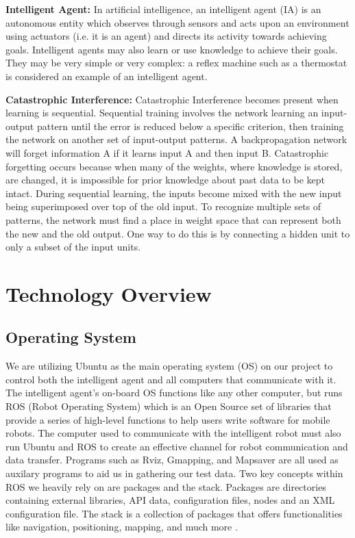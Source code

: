 \documentclass[draftclsnofoot, onecolumn, 10pt, compsoc]{IEEEtran}
\begin{document}
		\noindent\textbf{Intelligent Agent:} In artificial intelligence, an intelligent agent (IA) is an autonomous entity which observes through sensors and acts upon an environment using actuators (i.e. it is an agent) and directs its activity towards achieving goals. Intelligent agents may also learn or use knowledge to achieve their goals. They may be very simple or very complex: a reflex machine such as a thermostat is considered an example of an intelligent agent. \cite{Norvig}

		\noindent\textbf{Catastrophic Interference:} Catastrophic Interference becomes present when learning is sequential. Sequential training involves the network learning an input-output pattern until the error is reduced below a specific criterion, then training the network on another set of input-output patterns. A backpropagation network will forget information A if it learns input A and then input B. Catastrophic forgetting occurs because when many of the weights, where knowledge is stored, are changed, it is impossible for prior knowledge about past data to be kept intact. During sequential learning, the inputs become mixed with the new input being superimposed over top of the old input. To recognize multiple sets of patterns, the network must find a place in weight space that can represent both the new and the old output. One way to do this is by connecting a hidden unit to only a subset of the input units. \cite{ImgRecog} \cite{miller}

	\section{Technology Overview}
		\subsection{Operating System}
			We are utilizing Ubuntu as the main operating system (OS) on our project to control both the intelligent agent and all computers that communicate with it. The intelligent agent's on-board OS functions like any other computer, but runs ROS (Robot Operating System) which is an Open Source set of libraries that provide a series of high-level functions to help users write software for mobile robots. The computer used to communicate with the intelligent robot must also run Ubuntu and ROS to create an effective channel for robot communication and data transfer. Programs such as Rviz, Gmapping, and Mapsaver are all used as auxilary programs to aid us in gathering our test data. Two key concepts within ROS we heavily rely on are packages and the stack. Packages are directories containing external libraries, API data, configuration files, nodes and an XML configuration file. The stack is a collection of packages that offers functionalities like navigation, positioning, mapping, and much more \cite{ROSintro}.
\end{document}
